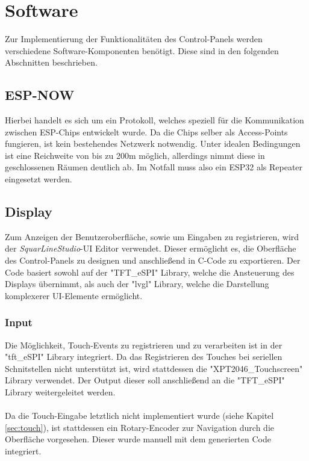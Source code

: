 \section{Software}
Zur Implementierung der Funktionalitäten des Control-Panels werden
verschiedene Software-Komponenten benötigt. Diese sind in den 
folgenden Abschnitten beschrieben.

    \subsection{ESP-NOW}
    Hierbei handelt es sich um ein Protokoll, welches
    speziell für die Kommunikation zwischen ESP-Chips
    entwickelt wurde. Da die Chips selber als Access-Points
    fungieren, ist kein bestehendes Netzwerk notwendig. Unter 
    idealen Bedingungen ist eine Reichweite von bis zu 200m 
    möglich, allerdings nimmt diese in geschlossenen Räumen
    deutlich ab. Im Notfall muss also ein ESP32 als Repeater
    eingesetzt werden. \cite{ESP-NOW-Reliability}
    
    \subsection{Display} 
    Zum Anzeigen der Benutzeroberfläche, sowie um Eingaben zu 
    registrieren, wird der \textit{SquarLineStudio}-UI Editor verwendet.
    Dieser ermöglicht es, die Oberfläche des Control-Panels zu
    designen und anschließend in C-Code zu exportieren.
    Der Code basiert sowohl auf der "TFT\_eSPI" \space Library, welche die
    Ansteuerung des Displays übernimmt, als auch der "lvgl" \space Library,
    welche die Darstellung komplexerer UI-Elemente ermöglicht.

    \subsubsection{Input}
    Die Möglichkeit, Touch-Events zu registrieren und zu verarbeiten ist 
    in der "tft\_eSPI" \space Library integriert. 
    Da das Registrieren des Touches bei seriellen Schnitstellen nicht unterstützt 
    ist, wird stattdessen die "XPT2046\_Touchscreen" Library verwendet. 
    Der Output dieser soll anschließend an die "TFT\_eSPI" Library weitergeleitet
    werden.
    \\~\\
    Da die Touch-Eingabe letztlich nicht implementiert wurde 
    (siehe Kapitel \ref{sec:touch}), ist stattdessen ein Rotary-Encoder
    zur Navigation durch die Oberfläche vorgesehen. Dieser wurde manuell 
    mit dem generierten Code integriert.
